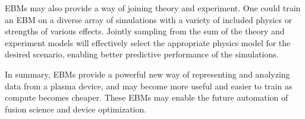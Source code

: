 EBMs may also provide a way of joining theory and experiment. One could train an EBM on a diverse array of simulations with a variety of included physics or strengths of various effects. Jointly sampling from the sum of the theory and experiment models will effectively select the appropriate physics model for the desired scenario, enabling better predictive performance of the simulations. 

In summary, EBMs provide a powerful new way of representing and analyzing data from a plasma device, and may become more useful and easier to train as compute becomes cheaper. These EBMs may enable the future automation of fusion science and device optimization.



%
%
%
%
